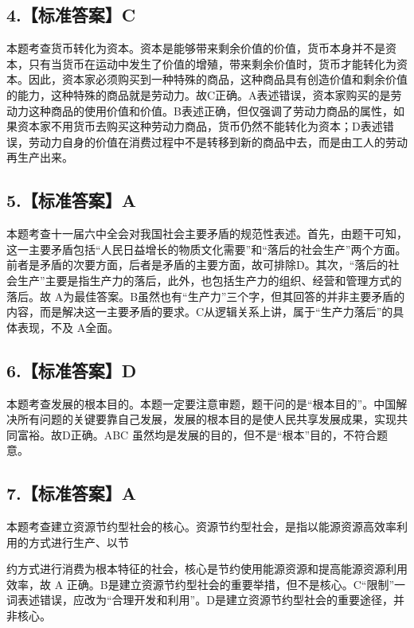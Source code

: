 \documentclass[UTF8,11pt]{ctexart}
\begin{document}
\subsection*{4.【标准答案】C}

本题考查货币转化为资本。资本是能够带来剩余价值的价值，货币本身并不是资本，只有当货币在运动中发生了价值的增殖，带来剩余价值时，货币才能转化为资本。因此，资本家必须购买到一种特殊的商品，这种商品具有创造价值和剩余价值的能力，这种特殊的商品就是劳动力。故C正确。A表述错误，资本家购买的是劳动力这种商品的使用价值和价值。B表述正确，但仅强调了劳动力商品的属性，如果资本家不用货币去购买这种劳动力商品，货币仍然不能转化为资本；D表述错误，劳动力自身的价值在消费过程中不是转移到新的商品中去，而是由工人的劳动再生产出来。


\subsection*{5.【标准答案】A}

本题考查十一届六中全会对我国社会主要矛盾的规范性表述。首先，由题干可知，这一主要矛盾包括“人民日益增长的物质文化需要”和“落后的社会生产”两个方面。前者是矛盾的次要方面，后者是矛盾的主要方面，故可排除D。其次，“落后的社会生产”主要是指生产力的落后，此外，也包括生产力的组织、经营和管理方式的落后。故 A为最佳答案。B虽然也有“生产力”三个字，但其回答的并非主要矛盾的内容，而是解决这一主要矛盾的要求。C从逻辑关系上讲，属于“生产力落后”的具体表现，不及 A全面。


\subsection*{6.【标准答案】D}

本题考查发展的根本目的。本题一定要注意审题，题干问的是“根本目的”。中国解决所有问题的关键要靠自己发展，发展的根本目的是使人民共享发展成果，实现共同富裕。故D正确。ABC 虽然均是发展的目的，但不是“根本”目的，不符合题意。


\subsection*{7.【标准答案】A}

本题考查建立资源节约型社会的核心。资源节约型社会，是指以能源资源高效率利用的方式进行生产、以节


约方式进行消费为根本特征的社会，核心是节约使用能源资源和提高能源资源利用效率，故 A 正确。B是建立资源节约型社会的重要举措，但不是核心。C“限制”一词表述错误，应改为“合理开发和利用”。D是建立资源节约型社会的重要途径，并非核心。
\end{document}
